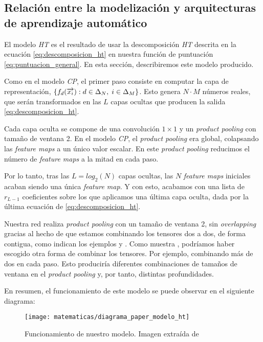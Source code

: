 \subsection{Relación entre la modelización y arquitecturas de aprendizaje automático}

El modelo \textit{HT} es el resultado de usar la descomposición \textit{HT} descrita en la ecuación \eqref{eq:descomposicion_ht} en nuestra función de puntuación \eqref{eq:puntuacion_general}. En esta sección, describiremos este modelo producido.

Como en el modelo \textit{CP}, el primer paso consiste en computar la capa de representación, $\{f_d(\overrightarrow{x_i}): d \in \Delta_{N}, \; i \in \Delta_{M}\}$. Esto genera $N \cdot M$ números reales, que serán transformados en las $L$ capas ocultas que producen la salida \eqref{eq:descomposicion_ht}.

Cada capa oculta se compone de una convolución $1 \times 1$ y un \textit{product pooling} con tamaño de ventana 2. En el modelo \textit{CP}, el \textit{product pooling} era global, colapsando las \textit{feature maps} a un único valor escalar. En este \textit{product pooling} reducimos el número de \textit{feature maps} a la mitad en cada paso.

Por lo tanto, tras las $L = log_2(N)$ capas ocultas, las $N$ \textit{feature maps} iniciales acaban siendo una única \textit{feature map}. Y con esto, acabamos con una lista de $r_{L - 1}$ coeficientes sobre los que aplicamos una última capa oculta, dada por la última ecuación de \eqref{eq:descomposicion_ht}.

Nuestra red realiza \textit{product pooling} con un tamaño de ventana 2, sin \textit{overlapping} gracias al hecho de que estamos combinando los tensores dos a dos, de forma contigua, como indican los ejemplos  y . Como muestra \cite{matematicas:descomposicion_ht}, podríamos haber escogido otra forma de combinar los tensores. Por ejemplo, combinando más de dos en cada paso. Esto produciría diferentes combinaciones de tamaños de ventana en el \textit{product pooling} y, por tanto, distintas profundidades.

En resumen, el funcionamiento de este modelo se puede observar en el siguiente diagrama:

\begin{figure}[H]
    \centering
    \texttt{[image: matematicas/diagrama\_paper\_modelo\_ht]}
    \caption{Funcionamiento de nuestro modelo. Imagen extraída de \cite{matematicas:principal}}
\end{figure}

